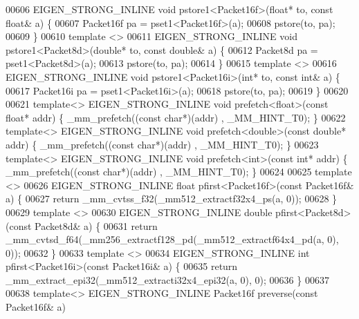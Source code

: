 \begin{DoxyCode}
00606 EIGEN\_STRONG\_INLINE \textcolor{keywordtype}{void} pstore1<Packet16f>(\textcolor{keywordtype}{float}* to, \textcolor{keyword}{const} \textcolor{keywordtype}{float}& a) \{
00607   Packet16f pa = pset1<Packet16f>(a);
00608   pstore(to, pa);
00609 \}
00610 \textcolor{keyword}{template} <>
00611 EIGEN\_STRONG\_INLINE \textcolor{keywordtype}{void} pstore1<Packet8d>(\textcolor{keywordtype}{double}* to, \textcolor{keyword}{const} \textcolor{keywordtype}{double}& a) \{
00612   Packet8d pa = pset1<Packet8d>(a);
00613   pstore(to, pa);
00614 \}
00615 \textcolor{keyword}{template} <>
00616 EIGEN\_STRONG\_INLINE \textcolor{keywordtype}{void} pstore1<Packet16i>(\textcolor{keywordtype}{int}* to, \textcolor{keyword}{const} \textcolor{keywordtype}{int}& a) \{
00617   Packet16i pa = pset1<Packet16i>(a);
00618   pstore(to, pa);
00619 \}
00620 
00621 \textcolor{keyword}{template}<> EIGEN\_STRONG\_INLINE \textcolor{keywordtype}{void} prefetch<float>(\textcolor{keyword}{const} \textcolor{keywordtype}{float}*   addr) \{ \_mm\_prefetch((\textcolor{keyword}{const} \textcolor{keywordtype}{char}*)(addr)
      , \_MM\_HINT\_T0); \}
00622 \textcolor{keyword}{template}<> EIGEN\_STRONG\_INLINE \textcolor{keywordtype}{void} prefetch<double>(\textcolor{keyword}{const} \textcolor{keywordtype}{double}* addr) \{ \_mm\_prefetch((\textcolor{keyword}{const} \textcolor{keywordtype}{char}*)(addr)
      , \_MM\_HINT\_T0); \}
00623 \textcolor{keyword}{template}<> EIGEN\_STRONG\_INLINE \textcolor{keywordtype}{void} prefetch<int>(\textcolor{keyword}{const} \textcolor{keywordtype}{int}*       addr) \{ \_mm\_prefetch((\textcolor{keyword}{const} \textcolor{keywordtype}{char}*)(addr)
      , \_MM\_HINT\_T0); \}
00624 
00625 \textcolor{keyword}{template} <>
00626 EIGEN\_STRONG\_INLINE \textcolor{keywordtype}{float} pfirst<Packet16f>(\textcolor{keyword}{const} Packet16f& a) \{
00627   \textcolor{keywordflow}{return} \_mm\_cvtss\_f32(\_mm512\_extractf32x4\_ps(a, 0));
00628 \}
00629 \textcolor{keyword}{template} <>
00630 EIGEN\_STRONG\_INLINE \textcolor{keywordtype}{double} pfirst<Packet8d>(\textcolor{keyword}{const} Packet8d& a) \{
00631   \textcolor{keywordflow}{return} \_mm\_cvtsd\_f64(\_mm256\_extractf128\_pd(\_mm512\_extractf64x4\_pd(a, 0), 0));
00632 \}
00633 \textcolor{keyword}{template} <>
00634 EIGEN\_STRONG\_INLINE \textcolor{keywordtype}{int} pfirst<Packet16i>(\textcolor{keyword}{const} Packet16i& a) \{
00635   \textcolor{keywordflow}{return} \_mm\_extract\_epi32(\_mm512\_extracti32x4\_epi32(a, 0), 0);
00636 \}
00637 
00638 \textcolor{keyword}{template}<> EIGEN\_STRONG\_INLINE Packet16f preverse(\textcolor{keyword}{const} Packet16f& a)

\end{DoxyCode}
